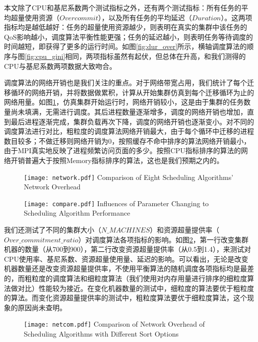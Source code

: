 本文除了CPU和基尼系数两个测试指标之外，还有两个测试指标：所有任务的平均超量使用资源（$Overcommit$），以及所有任务的平均延迟（$Duration$）。这两项指标均是越低越好：任务的超量使用资源越少，则表明在真实的集群中该任务的QoS影响越小，调度算法平衡性能更强；任务的延迟越小，则表明任务等待调度的时间越短，即获得了更多的运行时间。如图\ref{fig:dur_over}所示，横轴调度算法的顺序与图\ref{fig:cpu_gini}相同，两项指标虽然有起伏，但总体在升高，和我们测得的CPU与基尼系数两项数据大致吻合。

调度算法的网络开销也是我们关注的重点。对于网络带宽占用，我们统计了每个迁移循环的网络开销，并将数据做累积，计算从开始集群仿真到每个迁移循环为止的网络用量。如图\ref{fig:minetwork}，仿真集群开始运行时，网络开销较小，这是由于集群的任务数量尚未填满，无需进行调度。其后进程数量逐渐增多，调度的网络开销也增加，直到最后进程逐渐完成，集群负载再次下降，调度的网络开销也逐渐变小。对不同的调度算法进行对比，粗粒度的调度算法网络开销最大，由于每个循环中迁移的进程数目较多；不做迁移则网络开销为0，按照缓存不命中排序的算法网络开销最小，由于MPI真实地反映了进程频繁访问页面的多少。按照CPU指标排序的算法的网络开销普遍大于按照Memory指标排序的算法，这也是我们预期之内的。
\begin{figure}[!htp]
  \centering
  \texttt{[image: network.pdf]}
    {Comparison of Eight Scheduling Algorithms' Network Overhead}
  \label{fig:minetwork}
\end{figure}

\begin{figure}[!htp]
  \centering
  \texttt{[image: compare.pdf]}
    {Influences of Parameter Changing to Scheduling Algorithm Performance}
  \label{fig:comparing}
\end{figure}

我们还测试了不同的集群大小（$N\_MACHINES$）和资源超量提供率（$Over\_commitment\_ratio$）对调度算法各项指标的影响。如图\ref{fig:comparing}，第一行改变集群机器的数量（从700到900），第二行改变资源超量提供率（从0.5到1.4），来测试对CPU使用率、基尼系数、资源超量使用量、延迟的影响。可以看出，无论是改变机器数量还是改变资源超量提供率，不使用平衡算法的随机调度各项指标均是最差的，而粗粒度的调度算法和细粒度算法（我们使用对内存用量进行排序的细粒度算法做对比）性能较为接近。在变化机器数量的测试中，细粒度的算法要优于粗粒度的算法。而变化资源超量提供率的测试中，粗粒度算法要优于细粒度算法，这个现象的原因尚未查明。

\begin{figure}[!htp]
  \centering
  \texttt{[image: netcom.pdf]}
    {Comparison of Network Overhead of Scheduling Algorithms with Different Sort Options}
  \label{fig:netcom}
\end{figure}

